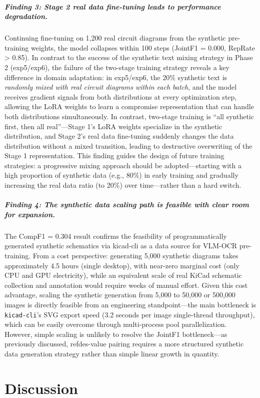 \subparagraph{Finding 3: Stage 2 real data fine-tuning leads to performance degradation.}
Continuing fine-tuning on 1,200 real circuit diagrams from the synthetic pre-training weights, the model collapses within 100 steps (JointF1 = 0.000, RepRate > 0.85). In contrast to the success of the synthetic text mixing strategy in Phase 2 (exp5/exp6), the failure of the two-stage training strategy reveals a key difference in domain adaptation: in exp5/exp6, the 20\% synthetic text is \textit{randomly mixed with real circuit diagrams within each batch}, and the model receives gradient signals from both distributions at every optimization step, allowing the LoRA weights to learn a compromise representation that can handle both distributions simultaneously. In contrast, two-stage training is ``all synthetic first, then all real''---Stage 1's LoRA weights specialize in the synthetic distribution, and Stage 2's real data fine-tuning suddenly changes the data distribution without a mixed transition, leading to destructive overwriting of the Stage 1 representation. This finding guides the design of future training strategies: a progressive mixing approach should be adopted---starting with a high proportion of synthetic data (e.g., 80\%) in early training and gradually increasing the real data ratio (to 20\%) over time---rather than a hard switch.

\subparagraph{Finding 4: The synthetic data scaling path is feasible with clear room for expansion.}
The CompF1 = 0.304 result confirms the feasibility of programmatically generated synthetic schematics via kicad-cli as a data source for VLM-OCR pre-training. From a cost perspective: generating 5,000 synthetic diagrams takes approximately 4.5 hours (single desktop), with near-zero marginal cost (only CPU and GPU electricity), while an equivalent scale of real KiCad schematic collection and annotation would require weeks of manual effort. Given this cost advantage, scaling the synthetic generation from 5,000 to 50,000 or 500,000 images is directly feasible from an engineering standpoint---the main bottleneck is \texttt{kicad-cli}'s SVG export speed (3.2 seconds per image single-thread throughput), which can be easily overcome through multi-process pool parallelization. However, simple scaling is unlikely to resolve the JointF1 bottleneck---as previously discussed, refdes-value pairing requires a more structured synthetic data generation strategy rather than simple linear growth in quantity.

\section{Discussion}

